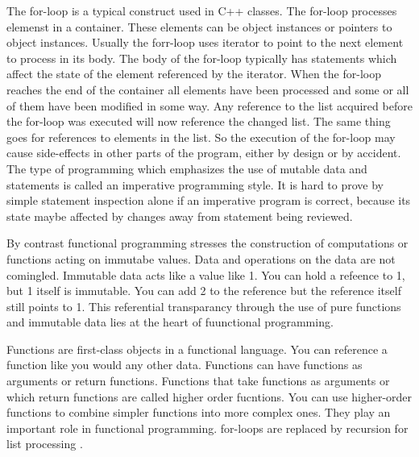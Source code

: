 \documentclass[12pt,fleqn]{article}
\begin{document}
The for-loop is a typical construct  used in C++ classes.
The for-loop  processes elemenst in a container.
These elements can be object instances or pointers to object instances.
Usually the forr-loop uses iterator to point to the next element to process in its body.
The body of the for-loop typically has statements which affect the state of the element referenced by the iterator.
When the for-loop reaches the end of the container all elements have been processed and some or all of them have been modified in some way.
Any reference to the list acquired before the for-loop was executed will now reference the changed list.
The same thing goes for references to elements in the list.
So the execution of the for-loop may cause side-effects in other parts of the program, either by design or by accident.
The type of programming which emphasizes the use of mutable data and statements is called an imperative programming style.
It is hard to prove by simple statement inspection alone if an imperative program is correct, because its state maybe affected by changes away from statement being reviewed.


By contrast functional programming stresses the construction of computations or functions acting on immutabe values.
Data and operations on the data are not comingled.
Immutable data acts like a value like 1. 
You can hold a refeence to 1, but 1 itself is immutable.
You can add 2 to the reference but the reference itself still points to 1.
This referential transparancy through the use of pure functions and immutable data lies at the heart of fuunctional programming.

Functions are first-class objects in a functional language.
You can reference a function like you would any other data.
Functions can have functions as arguments or return functions.
Functions that take functions as arguments or which return functions are called higher order fucntions.
You can use higher-order functions to combine simpler functions into more complex ones.
They play an important role in functional programming.
for-loops are replaced by recursion for list processing \cite{hutton, bird}.
\end{document}
